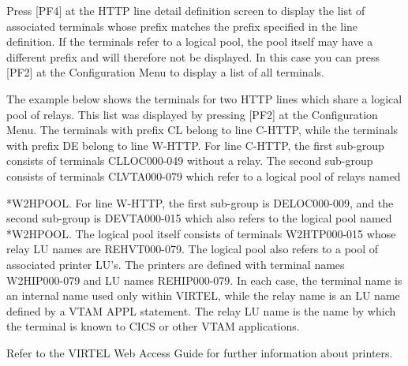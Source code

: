 \documentclass[letterpaper,10pt,english]{sphinxmanual}
\begin{document}
Press {[}PF4{]} at the HTTP line detail definition screen to display the list of associated terminals whose prefix matches the prefix specified in the line definition. If the terminals refer to a logical pool, the pool itself may have a different prefix and will therefore not be displayed. In this case you can press {[}PF2{]} at the Configuration Menu to display a list of all terminals.

The example below shows the terminals for two HTTP lines which share a logical pool of relays. This list was displayed by pressing {[}PF2{]} at the Configuration Menu. The terminals with prefix CL belong to line C-HTTP, while the terminals with prefix DE belong to line W-HTTP. For line C-HTTP, the first sub-group consists of terminals CLLOC000-049 without a relay. The second sub-group consists of terminals CLVTA000-079 which refer to a logical pool of relays named

*W2HPOOL. For line W-HTTP, the first sub-group is DELOC000-009, and the second sub-group is DEVTA000-015 which also refers to the logical pool named *W2HPOOL. The logical pool itself consists of terminals W2HTP000-015 whose relay LU names are REHVT000-079. The logical pool also refers to a pool of associated printer LU’s. The printers are defined with
terminal names W2HIP000-079 and LU names REHIP000-079. In each case, the terminal name is an internal name used only within VIRTEL, while the relay name is an LU name defined by a VTAM APPL statement. The relay LU name is the name by which the terminal is known to CICS or other VTAM applications.






Refer to the VIRTEL Web Access Guide for further information about printers.

\ignorespaces 
\end{document}

